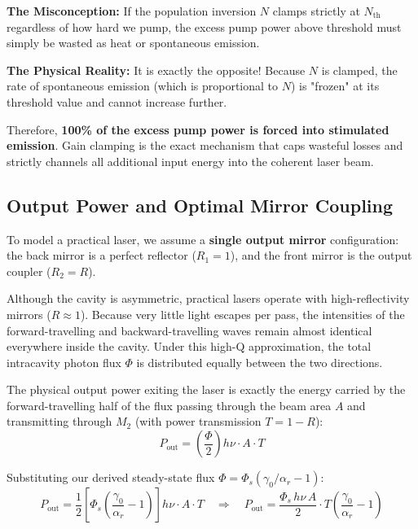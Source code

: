\begin{misconception}
    \textbf{The Misconception:} If the population inversion $N$ clamps strictly at $N_{\text{th}}$ regardless of how hard we pump, the excess pump power above threshold must simply be wasted as heat or spontaneous emission.

    \textbf{The Physical Reality:} It is exactly the opposite! Because $N$ is clamped, the rate of spontaneous emission (which is proportional to $N$) is "frozen" at its threshold value and cannot increase further.

    Therefore, \textbf{100\% of the excess pump power is forced into stimulated emission}. Gain clamping is the exact mechanism that caps wasteful losses and strictly channels all additional input energy into the coherent laser beam.
\end{misconception}

\subsection{Output Power and Optimal Mirror Coupling}

To model a practical laser, we assume a \textbf{single output mirror} configuration: the back mirror is a perfect reflector ($R_1 = 1$), and the front mirror is the output coupler ($R_2 = R$).

Although the cavity is asymmetric, practical lasers operate with high-reflectivity mirrors ($R \approx 1$). Because very little light escapes per pass, the intensities of the forward-travelling and backward-travelling waves remain almost identical everywhere inside the cavity. Under this high-Q approximation, the total intracavity photon flux $\Phi$ is distributed equally between the two directions.

The physical output power exiting the laser is exactly the energy carried by the forward-travelling half of the flux passing through the beam area $A$ and transmitting through $M_2$ (with power transmission $T = 1 - R$):
\begin{equation*}
    P_{\text{out}} = \left(\frac{\Phi}{2}\right) h\nu\cdot A\cdot T
\end{equation*}

Substituting our derived steady-state flux $\Phi = \Phi_s(\gamma_0/\alpha_r - 1)$:
\begin{equation*}
    P_{\text{out}} = \frac{1}{2} \left[ \Phi_s \left( \frac{\gamma_0}{\alpha_r} - 1 \right) \right] h\nu\cdot A\cdot T \quad \Rightarrow \quad P_{\text{out}} = \frac{\Phi_s\,h\nu\,A}{2}\cdot T\left(\frac{\gamma_0}{\alpha_r} - 1\right)
\end{equation*}

